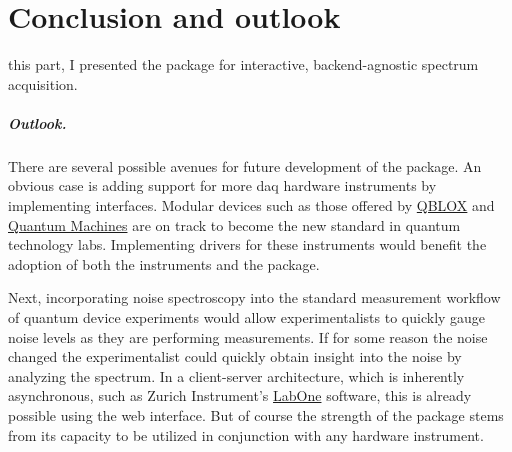 \chapter{Conclusion and outlook}\label{ch:speck:conclusion}
 this part, I presented the \pyspeck \python package for interactive, backend-agnostic spectrum acquisition.

\paragraph{Outlook.\label{par:speck:outlook}}
There are several possible avenues for future development of the \pyspeck package.
An obvious case is adding support for more \gls{daq} hardware instruments by implementing  interfaces.
Modular devices such as those offered by \href{https://www.qblox.com/research}{QBLOX} and \href{https://www.quantum-machines.co/}{Quantum Machines} are on track to become the new standard in quantum technology labs.
Implementing drivers for these instruments would benefit the adoption of both the instruments and the \pyspeck package.

Next, incorporating noise spectroscopy into the standard measurement workflow of quantum device experiments would allow experimentalists to quickly gauge noise levels as they are performing measurements.
If for some reason the noise changed
the experimentalist could quickly obtain insight into the noise by analyzing the spectrum.
In a client-server architecture, which is inherently asynchronous, such as Zurich Instrument's \href{https://www.zhinst.com/ch/en/instruments/labone/labone-instrument-control-software}{LabOne} software, this is already possible using the web interface.
But of course the strength of the \pyspeck package stems from its capacity to be utilized in conjunction with any hardware instrument.

